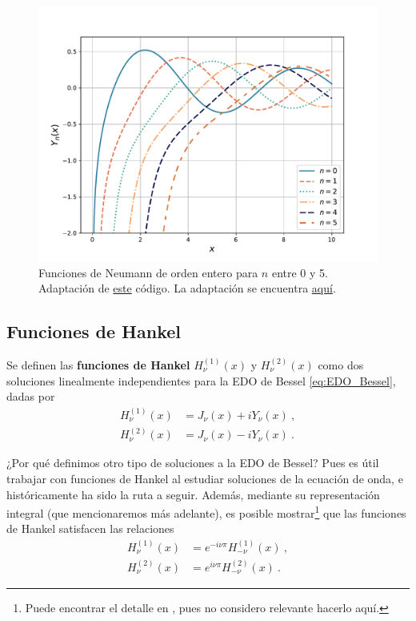 \begin{figure}
    \centering
    \includegraphics[width = 12cm]{Figuras/Bessel_second_kind.pdf}
    \caption{Funciones de Neumann de orden entero para $n$ entre 0 y 5. Adaptación de \href{https://github.com/gfrubi/FM2/blob/master/figuras-editables/fig-Bessel.py}{este} código. La adaptación se encuentra \href{https://github.com/Pedroga-cc/Fisica-Matematica-II/blob/main/Figuras/Plotter_Bessel.py}{aquí}.}
    \label{fig:Bessel_segunda_especie}
\end{figure}

\newpage

\subsection{Funciones de Hankel}

\begin{defi} 
    Se definen las \textbf{funciones de Hankel} $H_\nu^{(1)}(x)$ y $H_\nu^{(2)}(x)$ como dos soluciones linealmente independientes para la EDO de Bessel \eqref{eq:EDO_Bessel}, dadas por
    \begin{align}
        H_\nu^{(1)}(x) & = J_\nu(x) + i Y_\nu(x) \ , \\
        H_\nu^{(2)}(x) & = J_\nu(x) - i Y_\nu(x) \ .
    \end{align}
\end{defi}

¿Por qué definimos otro tipo de soluciones a la EDO de Bessel? Pues es útil trabajar con funciones de Hankel al estudiar soluciones de la ecuación de onda, e históricamente ha sido la ruta a seguir. Además, mediante su representación integral (que mencionaremos más adelante), es posible mostrar\footnote{Puede encontrar el detalle en \cite{Arfken}, pues no considero relevante hacerlo aquí.} que las funciones de Hankel satisfacen las relaciones
\begin{align}
    H_\nu^{(1)}(x) & = e^{-i\nu\pi} H_{-\nu}^{(1)}(x) \ , \\
    H_\nu^{(2)}(x) & = e^{i\nu\pi} H_{-\nu}^{(2)}(x) \ .
\end{align}

